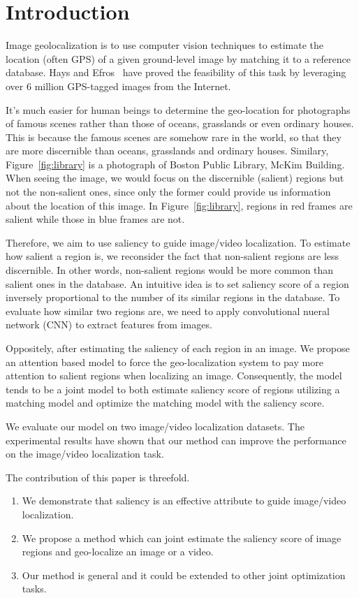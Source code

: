\section{Introduction}
\par
Image geolocalization is to use computer vision techniques to estimate the location (often GPS) of a given ground-level image by matching it to a reference database. Hays and Efros~\cite{hays2008im2gps} have proved the feasibility of this task by leveraging over 6 million GPS-tagged images from the Internet.
\par
It's much easier for human beings to determine the geo-location for photographs of famous scenes rather than those of oceans, grasslands or even ordinary houses. This is because the famous scenes are somehow rare in the world, so that they are more discernible than oceans, grasslands and ordinary houses. Similary, Figure~\ref{fig:library} is a photograph of Boston Public Library, McKim Building. When seeing the image, we would focus on the discernible (salient) regions but not the non-salient ones, since only the former could provide us information about the location of this image. In Figure~\ref{fig:library}, regions in red frames are salient while those in blue frames are not.
\par
Therefore, we aim to use saliency to guide image/video localization. To estimate how salient a region is, we reconsider the fact that non-salient regions are less discernible. In other words, non-salient regions would be more common than salient ones in the database. An intuitive idea is to set saliency score of a region inversely proportional to the number of its similar regions in the database. To evaluate how similar two regions are, we need to apply convolutional nueral network (CNN) to extract features from images. 
\par
Oppositely, after estimating the saliency of each region in an image. We propose an attention based model to force the geo-localization system to pay more attention to salient regions when localizing an image. Consequently, the model tends to be a joint model to both estimate saliency score of regions utilizing a matching model and optimize the matching model with the saliency score. 
\par
We evaluate our model on two image/video localization datasets. The experimental results have shown that our method can improve the performance on the image/video localization task.
\par
The contribution of this paper is threefold. 
\begin{enumerate}
\item We demonstrate that saliency is an effective attribute to guide image/video localization. 
\item We propose a method which can joint estimate the saliency score of image regions and geo-localize an image or a video.
\item Our method is general and it could be extended to other joint optimization tasks. 
\end{enumerate}

